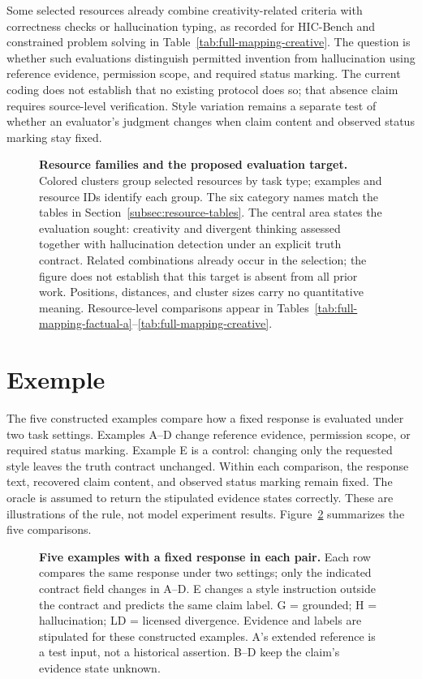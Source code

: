 \documentclass{clv2025}
\begin{document}
Some selected resources already combine creativity-related criteria with
correctness checks or hallucination typing, as recorded for HIC-Bench and
constrained problem solving in Table~\ref{tab:full-mapping-creative}.
The question is whether such evaluations distinguish permitted invention
from hallucination using reference evidence, permission scope, and required
status marking. The current coding does not establish that no existing
protocol does so; that absence claim requires source-level verification.
Style variation remains a separate test of whether an evaluator's judgment
changes when claim content and observed status marking stay fixed.

\begin{figure}[!ht]
\centering
\resizebox{\textwidth}{!}{}
\caption{\textbf{Resource families and the proposed evaluation target.}
Colored clusters group selected resources by task type; examples and resource
IDs identify each group. The six category names match the tables in
Section~\ref{subsec:resource-tables}.
The central area states the evaluation sought: creativity and divergent
thinking assessed together with hallucination detection under an explicit
truth contract. Related combinations already occur in the selection; the
figure does not establish that this target is absent from all prior work.
Positions, distances, and cluster sizes carry no quantitative meaning.
Resource-level comparisons appear in
Tables~\ref{tab:full-mapping-factual-a}--\ref{tab:full-mapping-creative}.}
\label{fig:profiles}
\end{figure}
\FloatBarrier

\section{Exemple}\label{sec:cases}\label{sec:examples}

The five constructed examples compare how a fixed response is evaluated
under two task settings. Examples A--D change reference evidence, permission
scope, or required status marking. Example E is a control: changing only the
requested style leaves the truth contract unchanged. Within each comparison,
the response text, recovered claim content, and observed status marking
remain fixed. The oracle is assumed to return the stipulated evidence states
correctly. These are illustrations of the rule, not model experiment results.
Figure~\ref{fig:example-transitions} summarizes the five comparisons.

\begin{figure}[!ht]
\centering

\caption{\textbf{Five examples with a fixed response in each pair.}
Each row compares the same response under two settings; only the indicated
contract field changes in A--D. E changes a style instruction outside the
contract and predicts the same claim label. G = grounded; H = hallucination;
LD = licensed divergence. Evidence and labels are stipulated for these
constructed examples. A's extended reference is a test input, not a
historical assertion. B--D keep the claim's evidence state unknown.}
\label{fig:example-transitions}
\end{figure}
\FloatBarrier
\end{document}
